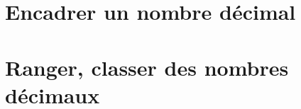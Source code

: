 \begin{pageCours}

\section{Encadrer un nombre décimal}

 



\section{Ranger, classer des nombres décimaux}


\end{pageCours}
\begin{pageAD} 

\Sf{ }


 

 
\Sf{ }



 
\end{pageAD} 
